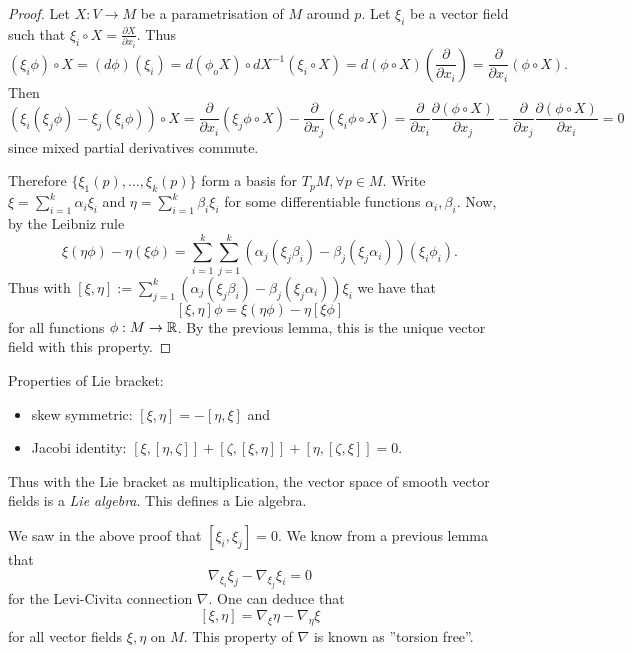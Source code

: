 \begin{proof}
	
	Let $ X: V \rightarrow M $ be a parametrisation of $ M $ around $ p $. Let $ \xi_i $ be a vector field such that $ \xi_i \circ X = \frac{\partial X}{\partial x_i}. $ Thus 
		\[ (\xi_i \phi) \circ X = (d\phi)(\xi_i) = d(\phi_oX) \circ dX^{-1}(\xi_i \circ X) = d(\phi \circ X)\left(\frac{\partial}{\partial x_i}\right) = \frac{\partial}{\partial x_i}(\phi \circ X). \]
	 Then
	 	\[ (\xi_i(\xi_j \phi) - \xi_j(\xi_i \phi)) \circ X 
	 		= \frac{\partial}{\partial x_i}(\xi_j\phi \circ X) - \frac{\partial}{\partial x_j}(\xi_i\phi \circ X) 
	 		= \frac{\partial}{\partial x_i}\frac{\partial(\phi \circ X)}{\partial x_j} - \frac{\partial}{\partial x_j}\frac{\partial(\phi \circ X)}{\partial x_i} 
	 		= 0 \]
	since mixed partial derivatives commute.
	
	Therefore $ \{ \xi_1(p), \dots, \xi_k(p) \} $ form a basis for $ T_pM, \forall p \in M $. Write $ \xi = \sum_{i =1}^{k} \alpha_i \xi_i $ and $ \eta = \sum_{i=1}^{k}\beta_i \xi_i $ for some differentiable functions $ \alpha_i,\beta_i $. Now, by the Leibniz rule
		\[ \xi(\eta \phi) - \eta(\xi \phi) = \sum_{i =1}^{k} \sum_{j =1}^{k} (\alpha_j ( \xi_j \beta_i) - \beta_j(\xi_j\alpha_i))(\xi_i\phi_i). \]
	Thus with $ [\xi,\eta] := \sum_{j =1}^{k} (\alpha_j ( \xi_j \beta_i) - \beta_j(\xi_j\alpha_i))\xi_i $ we have that 
		\[ [\xi,\eta]\phi = \xi(\eta\phi)-\eta[\xi\phi] \] for all functions $ \phi: M \rightarrow \mathbb R $. By the previous lemma, this is the unique vector field with this property.
\end{proof}

\begin{remark}
	Properties of Lie bracket:
	\begin{itemize}
		\item skew symmetric: $ [\xi,\eta] = - [\eta,\xi] $ and
		\item Jacobi identity: $ [\xi, [\eta,\zeta]] + [\zeta,[\xi,\eta]] + [\eta,[\zeta,\xi]] = 0 $.
	\end{itemize}
\end{remark}

\begin{definition}
	Thus with the Lie bracket as multiplication, the vector space of smooth vector fields is a \emph{Lie algebra}. This defines a Lie algebra.
\end{definition}

\begin{remark}
	We saw in the above proof that $[\xi_i,\xi_j]=0$. We know from a previous lemma that
	\[ \nabla_{\xi_i} \xi_j - \nabla_{\xi_j}\xi_i = 0 \]
	for the Levi-Civita connection $\nabla$. One can deduce that
	\[ [\xi,\eta] = \nabla_\xi \eta - \nabla_\eta \xi  \] 
	for all vector fields $\xi,\eta$ on $M$. This property of $\nabla$ is known as ''torsion free''.
\end{remark}

